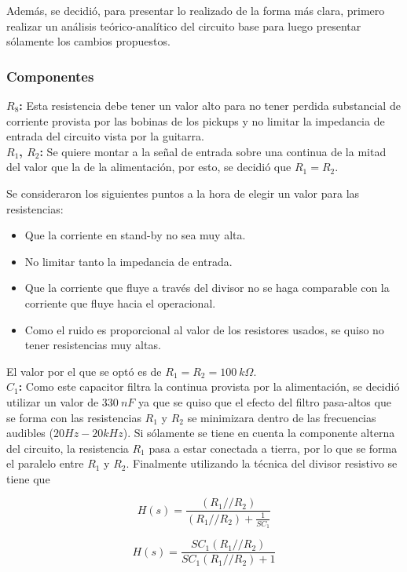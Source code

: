 Además, se decidió, para presentar lo realizado de la forma más clara, primero realizar un análisis teórico-analítico del circuito base para luego presentar sólamente los cambios propuestos.

\subsubsection{Componentes}

\textbf{$R_8$:}
Esta resistencia debe tener un valor alto para no tener perdida substancial de corriente provista por las bobinas de los pickups y no limitar la impedancia de entrada del circuito vista por la guitarra. \\

\textbf{$R_1$, $R_2$:} Se quiere montar a la señal de entrada sobre una continua de la mitad del valor que la de la alimentación, por esto, se decidió que $R_1=R_2$.

Se consideraron los siguientes puntos a la hora de elegir un valor para las resistencias:
\begin{itemize}
\item Que la corriente en stand-by no sea muy alta.
\item No limitar tanto la impedancia de entrada.
\item Que la corriente que fluye a través del divisor no se haga comparable con la corriente que fluye hacia el operacional.
\item Como el ruido es proporcional al valor de los resistores usados, se quiso no tener resistencias muy altas.
\end{itemize}
El valor por el que se optó es de $R_1=R_2=100 \ k\Omega$.\\

\textbf{$C_1$:} Como este capacitor filtra la continua provista por la alimentación, se decidió utilizar un valor de $330 \ nF$ ya que se quiso que el efecto del filtro pasa-altos que se forma con las resistencias $R_1$ y $R_2$ se minimizara dentro de las frecuencias audibles ($20Hz-20kHz$).
Si sólamente se tiene en cuenta la componente alterna del circuito, la resistencia $R_1$ pasa a estar conectada a tierra, por lo que se forma el paralelo entre $R_1$ y $R_2$. Finalmente utilizando la técnica del divisor resistivo se tiene que

\begin{equation}
H(s) = \frac{(R_1//R_2)}{(R_1//R_2) + \frac{1}{SC_1}}
\end{equation}

\begin{equation}
H(s) = \frac{SC_1(R_1//R_2)}{SC_1(R_1//R_2) + 1}
\end{equation}

